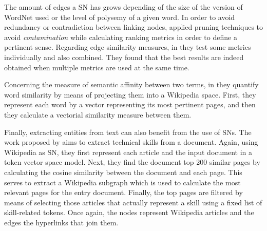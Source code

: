 The amount of edges a SN has grows depending of the size of the version of WordNet used or the level of polysemy of a given word. In order to avoid redundancy or contradiction between  linking nodes, \cite{2004.Mihalcea.SemanticNetworkPageRank,2007.Navigli.GraphConnectivity} applied pruning techniques to avoid \textit{contamination} while calculating ranking metrics in order to define a pertinent sense. Regarding edge similarity measures,  in  \cite{2007.Sinha.Mihalcea.Unsupervised, 2007.Tsatsaronis.WSDwithSpreading} they test some metrics individually and also combined. They found that the best results are indeed obtained when multiple metrics are used at the same time.


Concerning the measure of semantic affinity between two terms, in \cite{2009.Yeh.Wikiwalk} they quantify word similarity by means of projecting them into a Wikipedia space. First, they represent each word by a vector representing its most pertinent pages,  and then they calculate a vectorial similarity measure between them.




Finally, extracting entities from text can also benefit from the use of SNs. The work proposed by  \cite{2013.Kivimaki.AGraph-BasedApproach} aims to extract technical skills from a document. Again, using Wikipedia as SN, they first represent each article and the input document in a token vector space model.  Next, they find the document top 200 similar pages by calculating the cosine similarity between the document and each page. This serves to extract a Wikipedia subgraph which is used to calculate the most relevant pages for the entry document. Finally, the top pages are filtered by means of selecting those articles that actually represent a skill using a fixed list of skill-related tokens. Once again, the nodes represent Wikipedia articles and the edges the hyperlinks that join them.


